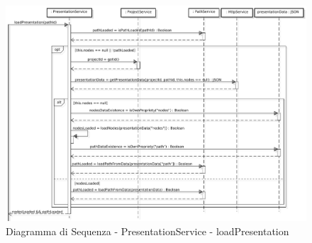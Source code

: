 \FloatBarrier
{}
\begin{center}
\begin{figure}[h]
\centering
\includegraphics[scale=0.29,keepaspectratio]{diagrammi/sequenza/FrontEnd/services/loadPresentation.pdf}
\caption{Diagramma di Sequenza - PresentationService - loadPresentation}
\end{figure}
\end{center}
\FloatBarrier
